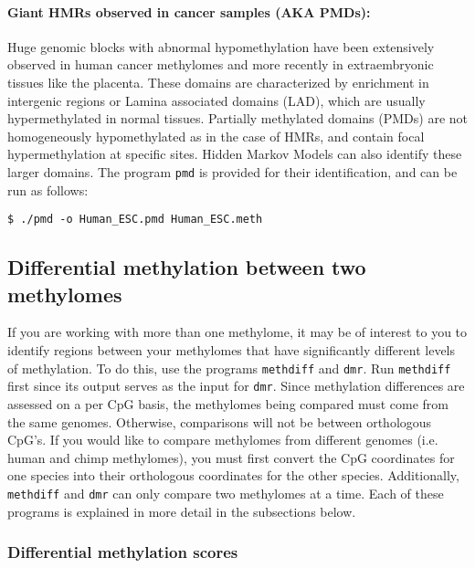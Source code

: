 \documentclass[10pt]{article}
\newcommand{\prog}[1]{\texttt{#1}}
\begin{document}
\paragraph{Giant HMRs observed in cancer samples (AKA PMDs):}

Huge genomic blocks with abnormal hypomethylation have been
extensively observed in human cancer methylomes and more recently
in extraembryonic tissues like the placenta. These domains are
characterized by enrichment in intergenic regions or Lamina 
associated domains (LAD), which are usually hypermethylated in 
normal tissues. Partially methylated domains (PMDs) are not
homogeneously hypomethylated as in the case of HMRs, and contain
focal hypermethylation at specific sites. Hidden Markov Models
can also identify these larger domains. The program \prog{pmd}
is provided for their identification, and can be run as follows:

\begin{verbatim}
$ ./pmd -o Human_ESC.pmd Human_ESC.meth
\end{verbatim}

\subsection{Differential methylation between two methylomes}
\label{sec:differential_methylation}

If you are working with more than one methylome, it may be of interest
to you to identify regions between your methylomes that have
significantly different levels of methylation. To do this, use the
programs \prog{methdiff} and \prog{dmr}. Run \prog{methdiff} first
since its output serves as the input for \prog{dmr}. Since methylation
differences are assessed on a per CpG basis, the methylomes being
compared must come from the same genomes. Otherwise, comparisons will
not be between orthologous CpG's. If you would like to compare
methylomes from different genomes (i.e. human and chimp methylomes),
you must first convert the CpG coordinates for one species into their
orthologous coordinates for the other species. Additionally,
\prog{methdiff} and \prog{dmr} can only compare two methylomes at a
time. Each of these programs is explained in more detail in the
subsections below.

\subsubsection{Differential methylation scores}
\label{sec:methdiff}
\end{document}

